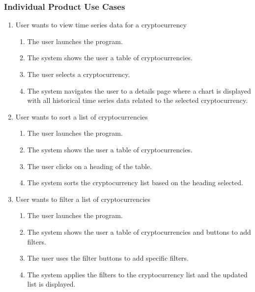 \documentclass[12pt, titlepage]{article}
\begin{document}
\subsubsection{Individual Product Use Cases}
\begin{enumerate}
    \item User wants to view time series data for a cryptocurrency
    \begin{enumerate}
        \item The user launches the program.
        \item The system shows the user a table of cryptocurrencies.
        \item The user selects a cryptocurrency.
        \item The system navigates the user to a details page where a chart is displayed with all historical time series data related to the selected cryptocurrency.
    \end{enumerate}
    
    \item User wants to sort a list of cryptocurrencies
    \begin{enumerate}
        \item The user launches the program.
        \item The system shows the user a table of cryptocurrencies.
        \item The user clicks on a heading of the table.
        \item The system sorts the cryptocurrency list based on the heading selected.
    \end{enumerate}
    
    \item User wants to filter a list of cryptocurrencies
    \begin{enumerate}
        \item The user launches the program.
        \item The system shows the user a table of cryptocurrencies and buttons to add filters.
        \item The user uses the filter buttons to add specific filters.
        \item The system applies the filters to the cryptocurrency list and the updated list is displayed.
    \end{enumerate}
    

\end{enumerate}
\end{document}
